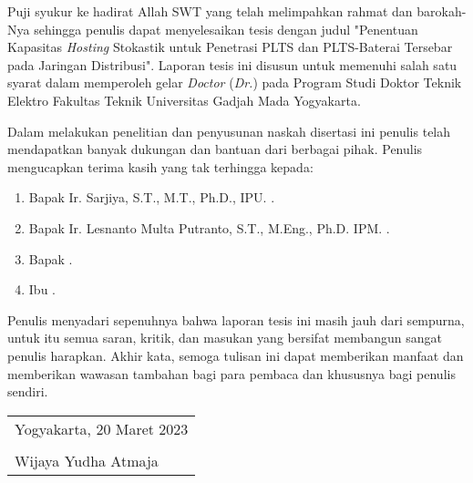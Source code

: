 Puji syukur ke hadirat Allah SWT yang telah melimpahkan rahmat dan barokah-Nya sehingga penulis dapat menyelesaikan tesis dengan judul "Penentuan Kapasitas \textit{Hosting} Stokastik untuk Penetrasi PLTS dan PLTS-Baterai Tersebar pada Jaringan Distribusi". Laporan tesis ini disusun untuk memenuhi salah satu syarat dalam memperoleh gelar \textit{Doctor} (\textit{Dr.}) pada Program Studi Doktor Teknik Elektro Fakultas Teknik Universitas Gadjah Mada Yogyakarta.

Dalam melakukan penelitian dan penyusunan naskah disertasi ini penulis telah mendapatkan banyak dukungan dan bantuan dari berbagai pihak. Penulis mengucapkan terima kasih yang tak terhingga kepada:

\begin{enumerate}
	\item Bapak Ir. Sarjiya, S.T., M.T., Ph.D., IPU. \lipsum[4].
	\item Bapak Ir. Lesnanto Multa Putranto, S.T., M.Eng., Ph.D. IPM. \lipsum[2].
	\item Bapak \lipsum[6].
	\item Ibu \lipsum[5].
\end{enumerate}

Penulis menyadari sepenuhnya bahwa laporan tesis ini masih jauh dari sempurna, untuk itu semua saran, kritik, dan masukan yang bersifat membangun sangat penulis harapkan. Akhir kata, semoga tulisan ini dapat memberikan manfaat dan memberikan wawasan tambahan bagi para pembaca dan khususnya bagi penulis sendiri.

\begin{flushright}
	\begin{tabular}{l}
		Yogyakarta, 20 Maret 2023 \\
		\vspace{1cm} \\
		Wijaya Yudha Atmaja
	\end{tabular}
\end{flushright}

